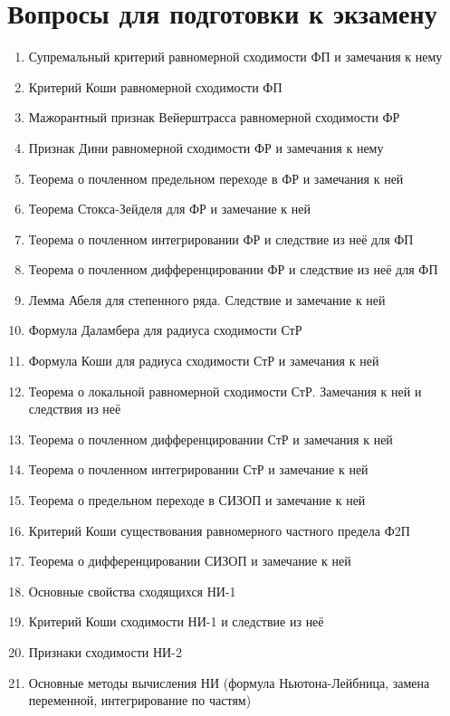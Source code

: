 \documentclass[../main.tex]{subfiles}
\begin{document}
 \chapter*{Вопросы для подготовки к экзамену}
 
 \begin{enumerate}
    \item Супремальный критерий равномерной сходимости ФП и замечания к нему
    \item Критерий Коши равномерной сходимости ФП
    \item Мажорантный признак Вейерштрасса равномерной сходимости ФР
    \item Признак Дини равномерной сходимости ФР и замечания к нему
    \item Теорема о почленном предельном переходе в ФР и замечания к ней
    \item Теорема Стокса-Зейделя для ФР и замечание к ней
    \item Теорема о почленном интегрировании ФР и следствие из неё для ФП
    \item Теорема о почленном дифференцировании ФР и следствие из неё для ФП
    \item Лемма Абеля для степенного ряда. Следствие и замечание к ней
    \item Формула Даламбера для радиуса сходимости СтР
    \item Формула Коши для радиуса сходимости СтР и замечания к ней
    \item Теорема о локальной равномерной сходимости СтР. Замечания к ней и следствия из неё
    \item Теорема о почленном дифференцировании СтР и замечания к ней
    \item Теорема о почленном интегрировании СтР и замечание к ней
    \item Теорема о предельном переходе в СИЗОП и замечание к ней
    \item Критерий Коши существования равномерного частного предела Ф2П
    \item Теорема о дифференцировании СИЗОП и замечание к ней
    \item Основные свойства сходящихся НИ-1
    \item Критерий Коши сходимости НИ-1 и следствие из неё
    \item Признаки сходимости НИ-2
    \item Основные методы вычисления НИ (формула Ньютона-Лейбница, замена переменной, интегрирование по частям)

\end{enumerate}
\end{document}

